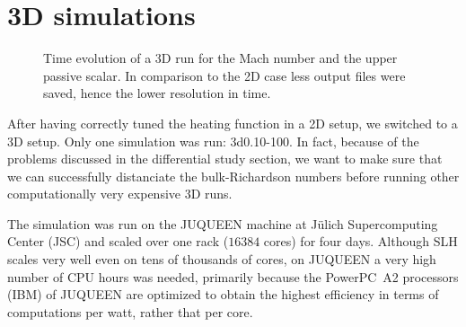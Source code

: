 \section{3D simulations}
\begin{figure}[b!]
      \centering
     \centering
	\hfill
	\caption{Time evolution of a 3D run for the Mach number and the upper passive scalar. In comparison to the 2D case less output files were saved, hence the lower resolution in time.}
	\label{fig:3dsingle}
\end{figure}
After having correctly tuned the heating function in a 2D setup, we switched to a 3D setup. Only one simulation was run: 3d0.10-100. In fact, because of the problems discussed in the differential study section, we want to make sure that we can successfully distanciate the bulk-Richardson numbers before running other computationally very expensive 3D runs.

The simulation was run on the JUQUEEN machine at Jülich Supercomputing Center (JSC) and scaled over one rack ($16384$ cores) for four days. Although SLH scales very well even on tens of thousands of cores, on JUQUEEN a very high number of CPU hours was needed, primarily because the PowerPC\textregistered \ A2 processors (IBM) of JUQUEEN are optimized to obtain the highest efficiency in terms of computations per watt, rather that per core. 
 
